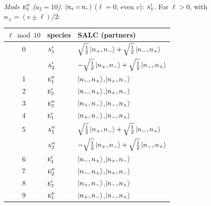 \documentclass[11pt]{article}
\newcommand{\irr}[1]{\text{\normalfont\scshape #1}}
\begin{document}
\emph{Mode $\irr{e}_{1}''$ ($a_2=10$).} $\ket{n_{\!+}\!=\!n_{\!-}}$ ($\ell=0$, even $v$): $\irr{a}_{1}'$. For $\ell>0$, with $n_\pm=(v\pm\ell)/2$:
\begin{longtable}{c l l}\hline $\ell\bmod 10$ & species & SALC (partners)\\ \hline\endhead
0 & $\irr{a}_{1}'$ & $\sqrt{\tfrac{1}{2}}\ket{n_+,n_-}+\sqrt{\tfrac{1}{2}}\ket{n_-,n_+}$\\
 & $\irr{a}_{2}'$ & $-\sqrt{\tfrac{1}{2}}\ket{n_+,n_-}+\sqrt{\tfrac{1}{2}}\ket{n_-,n_+}$\\
1 & $\irr{e}_{1}''$ & $\ket{n_-,n_+}$,\quad $\ket{n_+,n_-}$\\
2 & $\irr{e}_{2}'$ & $\ket{n_-,n_+}$,\quad $\ket{n_+,n_-}$\\
3 & $\irr{e}_{2}''$ & $\ket{n_+,n_-}$,\quad $\ket{n_-,n_+}$\\
4 & $\irr{e}_{1}'$ & $\ket{n_+,n_-}$,\quad $\ket{n_-,n_+}$\\
5 & $\irr{a}_{1}''$ & $\sqrt{\tfrac{1}{2}}\ket{n_+,n_-}+\sqrt{\tfrac{1}{2}}\ket{n_-,n_+}$\\
 & $\irr{a}_{2}''$ & $-\sqrt{\tfrac{1}{2}}\ket{n_+,n_-}+\sqrt{\tfrac{1}{2}}\ket{n_-,n_+}$\\
6 & $\irr{e}_{1}'$ & $\ket{n_-,n_+}$,\quad $\ket{n_+,n_-}$\\
7 & $\irr{e}_{2}''$ & $\ket{n_-,n_+}$,\quad $\ket{n_+,n_-}$\\
8 & $\irr{e}_{2}'$ & $\ket{n_+,n_-}$,\quad $\ket{n_-,n_+}$\\
9 & $\irr{e}_{1}''$ & $\ket{n_+,n_-}$,\quad $\ket{n_-,n_+}$\\
\hline\end{longtable}
\end{document}
